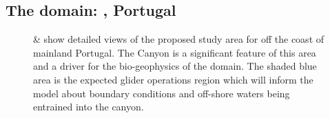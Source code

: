 \subsection{The domain: \naze, Portugal}
\label{sec:naz}

\begin{figure}[!b]
  \vspace{-0.5cm} 
  \centering 
  \hspace{+0.3cm} 
  \caption{ \&  show detailed
    views of the proposed study area for \proj off the coast of
    mainland Portugal. The \naz Canyon is a significant feature of
    this area and a driver for the bio-geophysics of the domain. The
    shaded blue area is the expected glider operations region which
    will inform the model about boundary conditions and off-shore
    waters being entrained into the canyon.}
  \label{fig:studyarea-1}
\end{figure}

